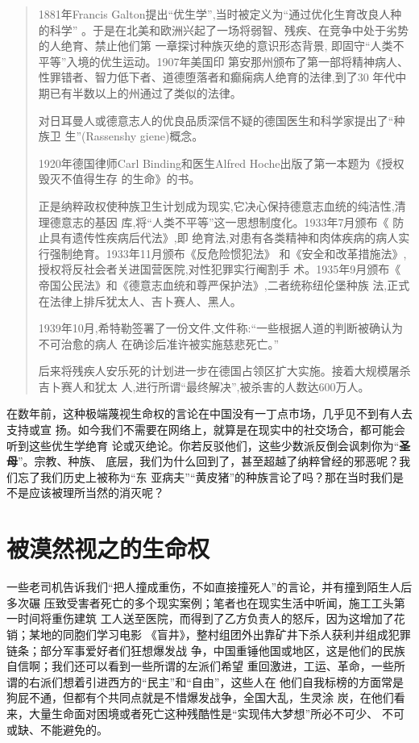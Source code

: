 \begin{quotation}
  
  1881年Francis Galton提出“优生学”,当时被定义为“通过优化生育改良人种
  的科学” 。于是在北美和欧洲兴起了一场将弱智、残疾、在竞争中处于劣势的人绝育、禁止他们第
  一章探讨种族灭绝的意识形态背景, 即固守“人类不平等”入境的优生运动。1907年美国印
  第安那州颁布了第一部将精神病人、性罪错者、智力低下者、道德堕落者和癫痫病人绝育的法律,到了30
  年代中期已有半数以上的州通过了类似的法律。

  对日耳曼人或德意志人的优良品质深信不疑的德国医生和科学家提出了“种族卫
  生”(Rassenshy giene)概念。

  1920年德国律师Carl Binding和医生Alfred Hoche出版了第一本题为《授权毁灭不值得生存
  的生命》的书。

  正是纳粹政权使种族卫生计划成为现实,它决心保持德意志血统的纯洁性,清理德意志的基因
  库,将“人类不平等”这一思想制度化。1933年7月颁布《 防止具有遗传性疾病后代法》,即
  绝育法,对患有各类精神和肉体疾病的病人实行强制绝育。1933年11月颁布《反危险惯犯法》
  和《安全和改革措施法》, 授权将反社会者关进国营医院,对性犯罪实行阉割手
  术。1935年9月颁布《 帝国公民法》和《德意志血统和尊严保护法》,二者统称纽伦堡种族
  法,正式在法律上排斥犹太人、吉卜赛人、黑人。

  1939年10月,希特勒签署了一份文件,文件称:“一些根据人道的判断被确认为不可治愈的病人
  在确诊后准许被实施慈悲死亡。”

  后来将残疾人安乐死的计划进一步在德国占领区扩大实施。接着大规模屠杀吉卜赛人和犹太
  人,进行所谓“最终解决”,被杀害的人数达600万人。
\end{quotation}

在数年前，这种极端蔑视生命权的言论在中国没有一丁点市场，几乎见不到有人去支持或宣
扬。如今我们不需要在网络上，就算是在现实中的社交场合，都可能会听到这些优生学绝育
论或灭绝论。你若反驳他们，这些少数派反倒会讽刺你为“\textbf{圣母}”。宗教、种族、
底层，我们为什么回到了，甚至超越了纳粹曾经的邪恶呢？我们忘了我们历史上被称为“东
亚病夫”“黄皮猪”的种族言论了吗？那在当时我们是不是应该被理所当然的消灭呢？

\section{被漠然视之的生命权}

一些老司机告诉我们“把人撞成重伤，不如直接撞死人”的言论，并有撞到陌生人后多次碾
压致受害者死亡的多个现实案例；笔者也在现实生活中听闻，施工工头第一时间将重伤建筑
工人送至医院，而得到了乙方负责人的怒斥，因为这增加了花销；某地的同胞们学习电影
《盲井》，整村组团外出靠矿井下杀人获利并组成犯罪链条；部分军事爱好者们狂想爆发战
争，中国重锤他国或地区，这是他们的民族自信啊；我们还可以看到一些所谓的左派们希望
重回激进，工运、革命，一些所谓的右派们想着引进西方的“民主”和“自由”，这些人在
他们自我标榜的方面常是狗屁不通，但都有个共同点就是不惜爆发战争，全国大乱，生灵涂
炭，在他们看来，大量生命面对困境或者死亡这种残酷性是“实现伟大梦想”所必不可少、
不可或缺、不能避免的。

